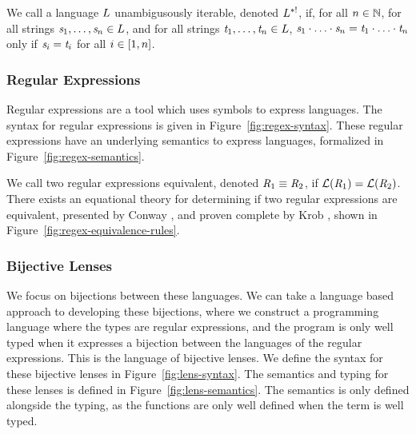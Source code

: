 \begin{definition}
We call a language $L$ unambigusously iterable,
denoted $L{}^{*!}$,
if, for all $n\in\mathbb{N}$, for all strings $\mathit{s}_1,\ldots,\mathit{s}_n\in L$,
and for all strings $\mathit{t}_1,\ldots,\mathit{t}_n\in L$,
$\mathit{s}_1\cdot\ldots\cdot\mathit{s}_n=\mathit{t}_1\cdot\ldots\cdot\mathit{t}_n$
only if $\mathit{s}_i=\mathit{t}_i$ for all $i\in[1,n]$.
\end{definition}

\subsubsection{Regular Expressions}


Regular expressions are a tool which uses symbols to express languages.
The syntax for regular expressions is given in Figure~\ref{fig:regex-syntax}.
These regular expressions have an underlying semantics to express languages,
formalized in Figure~\ref{fig:regex-semantics}.


We call two regular expressions equivalent, denoted $\mathit{R}_1\equiv\mathit{R}_2$,
if $\mathcal{L}(\mathit{R}_1)=\mathcal{L}(\mathit{R}_2)$.
There exists an equational theory for determining if two regular expressions are equivalent,
presented by Conway \cite{conway},
and proven complete by Krob \cite{Krob},
shown in Figure~\ref{fig:regex-equivalence-rules}.

\subsubsection{Bijective Lenses}


We focus on bijections between these languages.
We can take a language based approach to developing these bijections,
where we construct a programming language where the types are regular expressions,
and the program is only well typed when it expresses a bijection between the languages
of the regular expressions.
This is the language of bijective lenses.
We define the syntax for these bijective lenses in Figure~\ref{fig:lens-syntax}.
The semantics and typing for these lenses is defined in Figure~\ref{fig:lens-semantics}.
The semantics is only defined alongside the typing, as the functions are only
well defined when the term is well typed.

